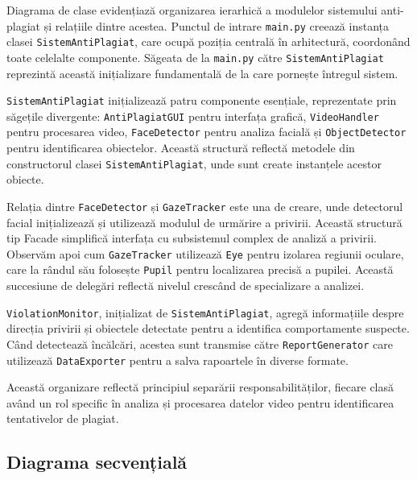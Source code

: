 \documentclass[12pt,a4paper]{article}
\begin{document}
Diagrama de clase evidențiază organizarea ierarhică a modulelor sistemului anti-plagiat și relațiile dintre acestea. Punctul de intrare \texttt{main.py} creează instanța clasei \texttt{SistemAntiPlagiat}, care ocupă poziția centrală în arhitectură, coordonând toate celelalte componente. Săgeata de la \texttt{main.py} către \texttt{SistemAntiPlagiat} reprezintă această inițializare fundamentală de la care pornește întregul sistem.

\texttt{SistemAntiPlagiat} inițializează patru componente esențiale, reprezentate prin săgețile divergente: \texttt{AntiPlagiatGUI} pentru interfața grafică, \texttt{VideoHandler} pentru procesarea video, \texttt{FaceDetector} pentru analiza facială și \texttt{ObjectDetector} pentru identificarea obiectelor. Această structură reflectă metodele din constructorul clasei \texttt{SistemAntiPlagiat}, unde sunt create instanțele acestor obiecte.

Relația dintre \texttt{FaceDetector} și \texttt{GazeTracker} este una de creare, unde detectorul facial inițializează și utilizează modulul de urmărire a privirii. Această structură tip Facade simplifică interfața cu subsistemul complex de analiză a privirii. Observăm apoi cum \texttt{GazeTracker} utilizează \texttt{Eye} pentru izolarea regiunii oculare, care la rândul său folosește \texttt{Pupil} pentru localizarea precisă a pupilei. Această succesiune de delegări reflectă nivelul crescând de specializare a analizei.

\texttt{ViolationMonitor}, inițializat de \texttt{SistemAntiPlagiat}, agregă informațiile despre direcția privirii și obiectele detectate pentru a identifica comportamente suspecte. Când detectează încălcări, acestea sunt transmise către \texttt{ReportGenerator} care utilizează \texttt{DataExporter} pentru a salva rapoartele în diverse formate.

Această organizare reflectă principiul separării responsabilităților, fiecare clasă având un rol specific în analiza și procesarea datelor video pentru identificarea tentativelor de plagiat.

\subsection{Diagrama secvențială}
\end{document}
